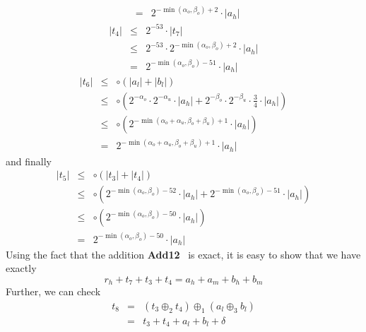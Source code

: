 \documentclass[a4paper,10pt,twoside]{article}
\newenvironment{proof}[1][Proof]{\begin{trivlist}
\item[\hskip \labelsep {\bfseries #1}]}{\end{trivlist}}
\newcommand{\hi}{\ensuremath{\mathit{h}}}
\newcommand{\mi}{\ensuremath{\mathit{m}}}
\newcommand{\lo}{\ensuremath{\mathit{l}}}
\newcommand{\Add}{{\bf Add12}}
\begin{document}
\begin{proof}
\begin{eqnarray*}
& = & 2^{-\min\left(\alpha_o,\beta_o\right) + 2} \cdot \left \vert a_\hi \right \vert
\end{eqnarray*}
\begin{eqnarray*}
\left \vert t_4 \right \vert & \leq & 2^{-53} \cdot \left \vert t_7 \right \vert \\
& \leq & 2^{-53} \cdot 2^{-\min\left(\alpha_o,\beta_o\right)+2} \cdot \left \vert a_\hi \right \vert \\
& = & 2^{-\min\left(\alpha_o,\beta_o\right) -51} \cdot \left \vert a_\hi \right \vert
\end{eqnarray*}
\begin{eqnarray*}
\left \vert t_6 \right \vert & \leq & \circ \left( \left \vert a_\lo \right \vert + \left \vert b_\lo \right \vert \right) \\
& \leq & \circ \left( 2^{-\alpha_o} \cdot 2^{-\alpha_u} \cdot \left \vert a_\hi \right \vert + 
                      2^{-\beta_o} \cdot 2^{-\beta_u} \cdot \frac{3}{4} \cdot \left \vert a_\hi \right \vert \right) \\
& \leq & \circ \left( 2^{-\min\left(\alpha_o + \alpha_u,\beta_o + \beta_u\right) + 1} \cdot \left \vert a_\hi \right \vert \right) \\
& = & 2^{-\min\left(\alpha_o + \alpha_u,\beta_o + \beta_u\right) + 1} \cdot \left \vert a_\hi \right \vert 
\end{eqnarray*}
and finally
\begin{eqnarray*}
\left \vert t_5 \right \vert & \leq & \circ \left( \left \vert t_3 \right \vert + \left \vert t_4 \right \vert \right) \\
& \leq & \circ \left( 2^{-\min\left(\alpha_o,\beta_o\right) -52} \cdot \left \vert a_\hi \right \vert + 
2^{-\min\left(\alpha_o,\beta_o\right)-51} \cdot \left \vert a_\hi \right \vert \right) \\
& \leq & \circ \left( 2^{-\min\left(\alpha_o,\beta_o\right) -50} \cdot \left \vert a_\hi \right \vert \right) \\
& = & 2^{-\min\left(\alpha_o,\beta_o\right)-50} \cdot \left \vert a_\hi \right \vert
\end{eqnarray*}
Using the fact that the addition \Add~ is exact, it is easy to show that we
have exactly
$$r_\hi + t_7 + t_3 + t_4 = a_\hi + a_\mi + b_\hi + b_\mi$$
Further, we can check 
\begin{eqnarray*}
t_8 & = & \left( t_3 \oplus_2 t_4 \right) \oplus_1 \left( a_\lo \oplus_3 b_\lo \right) \\
& = & t_3 + t_4 + a_\lo + b_\lo + \delta
\end{eqnarray*}

\end{proof}
\end{document}
